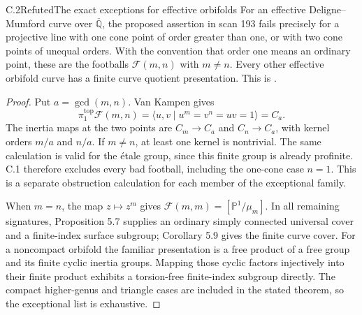 \begin{statement}{C.2}{Refuted}{The exact exceptions for effective orbifolds}
For an effective Deligne--Mumford curve over $\overline{\mathbb Q}$,
the proposed assertion in scan 193 fails precisely for a projective
line with one cone point of order greater than one, or with two cone
points of unequal orders. With the convention that order one means
an ordinary point, these are the footballs $\mathcal F(m,n)$ with
$m\ne n$. Every other effective orbifold curve has a finite curve
quotient presentation. This is
\citet[Proposition 5.7 and Corollary 5.9]{BehrendNoohi2006}.
\end{statement}
\begin{proof}
Put $a=\gcd(m,n)$. Van Kampen gives
\[
 \pi_1^{\mathrm{top}}\mathcal F(m,n)
 =\langle u,v\mid u^m=v^n=uv=1\rangle=C_a.
\]
The inertia maps at the two points are $C_m\to C_a$ and
$C_n\to C_a$, with kernel orders $m/a$ and $n/a$. If $m\ne n$,
at least one kernel is nontrivial. The same calculation is valid
for the \'etale group, since this finite group is already profinite.
C.1 therefore excludes every bad football, including the one-cone
case $n=1$. This is a separate obstruction calculation for each
member of the exceptional family.

When $m=n$, the map $z\mapsto z^m$ gives
$\mathcal F(m,m)=[\mathbb P^1/\mu_m]$. In all remaining signatures,
Proposition 5.7 supplies an ordinary simply connected universal
cover and a finite-index surface subgroup; Corollary 5.9 gives
the finite curve cover. For a noncompact orbifold the familiar
presentation is a free product of a free group and its finite
cyclic inertia groups. Mapping those cyclic factors injectively
into their finite product exhibits a torsion-free finite-index
subgroup directly. The compact higher-genus and triangle cases
are included in the stated theorem, so the exceptional list is
exhaustive.
\end{proof}

